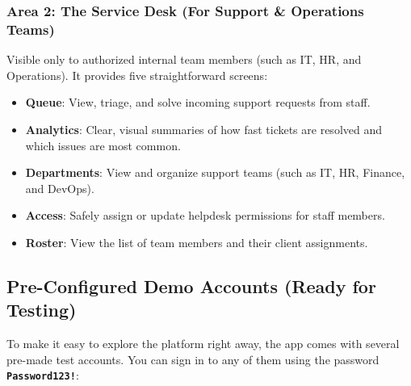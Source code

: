 \documentclass[a4paper,11pt]{article}
\begin{document}
\subsubsection{Area 2: The Service Desk (For Support \& Operations Teams)}
Visible only to authorized internal team members (such as IT, HR, and Operations). It provides five straightforward screens:
\begin{itemize}
    \item \textbf{Queue}: View, triage, and solve incoming support requests from staff.
    \item \textbf{Analytics}: Clear, visual summaries of how fast tickets are resolved and which issues are most common.
    \item \textbf{Departments}: View and organize support teams (such as IT, HR, Finance, and DevOps).
    \item \textbf{Access}: Safely assign or update helpdesk permissions for staff members.
    \item \textbf{Roster}: View the list of team members and their client assignments.
\end{itemize}

\subsection{Pre-Configured Demo Accounts (Ready for Testing)}
To make it easy to explore the platform right away, the app comes with several pre-made test accounts. You can sign in to any of them using the password \textbf{\texttt{Password123!}}:
\end{document}
